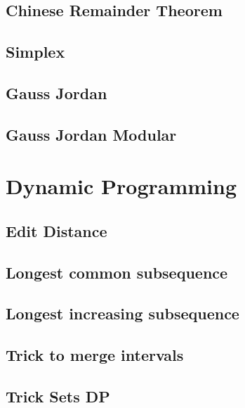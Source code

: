 \subsection{Chinese Remainder Theorem}
\raggedbottom
\hrulefill
\subsection{Simplex}
\raggedbottom
\hrulefill
\subsection{Gauss Jordan}
\raggedbottom
\hrulefill
\subsection{Gauss Jordan Modular}
\raggedbottom
\hrulefill

\section{Dynamic Programming}
\subsection{Edit Distance}
\raggedbottom
\hrulefill
\subsection{Longest common subsequence}
\raggedbottom
\hrulefill
\subsection{Longest increasing subsequence}
\raggedbottom
\hrulefill
\subsection{Trick to merge intervals}
\raggedbottom
\hrulefill
\subsection{Trick Sets DP}
\raggedbottom
\hrulefill
